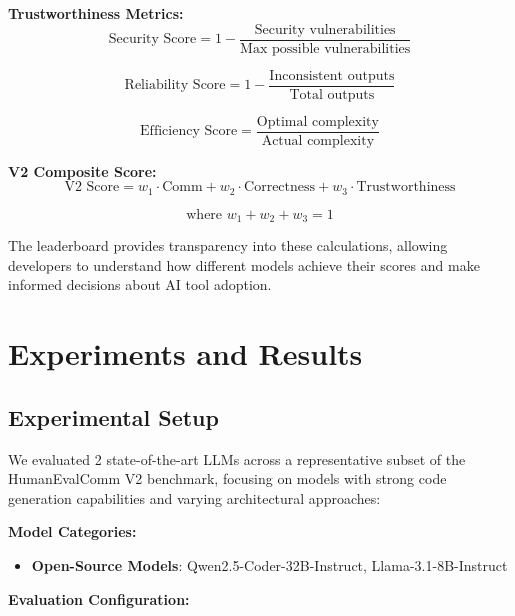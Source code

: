 \documentclass[conference]{IEEEtran}
\begin{document}
\textbf{Trustworthiness Metrics:}
\begin{equation}
\text{Security Score} = 1 - \frac{\text{Security vulnerabilities}}{\text{Max possible vulnerabilities}}
\end{equation}

\begin{equation}
\text{Reliability Score} = 1 - \frac{\text{Inconsistent outputs}}{\text{Total outputs}}
\end{equation}

\begin{equation}
\text{Efficiency Score} = \frac{\text{Optimal complexity}}{\text{Actual complexity}}
\end{equation}

\textbf{V2 Composite Score:}
\begin{equation}
\text{V2 Score} = w_1 \cdot \text{Comm} + w_2 \cdot \text{Correctness} + w_3 \cdot \text{Trustworthiness}
\end{equation}

\begin{equation}
\text{where } w_1 + w_2 + w_3 = 1
\end{equation}

The leaderboard provides transparency into these calculations, allowing developers to understand how different models achieve their scores and make informed decisions about AI tool adoption.

\section{Experiments and Results}

\subsection{Experimental Setup}

We evaluated 2 state-of-the-art LLMs across a representative subset of the HumanEvalComm V2 benchmark, focusing on models with strong code generation capabilities and varying architectural approaches:

\textbf{Model Categories:}

\begin{itemize}
    \item \textbf{Open-Source Models}: Qwen2.5-Coder-32B-Instruct, Llama-3.1-8B-Instruct
\end{itemize}

\textbf{Evaluation Configuration:}
\end{document}
